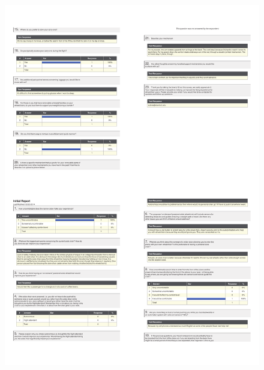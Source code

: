 \begin{figure}[h]
  \centering
     \includegraphics[scale=0.75]{images/Response3.pdf}
 \label{fig:Response3}
\end{figure}

